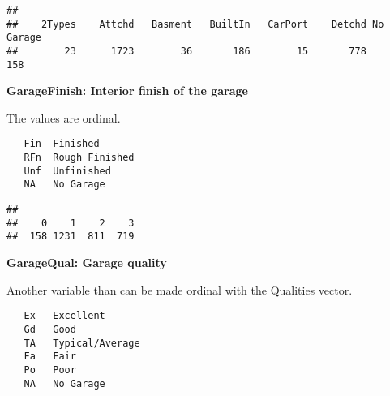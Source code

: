 \documentclass[]{article}
\newenvironment{Shaded}{\begin{snugshade}}{\end{snugshade}}
\newcommand{\DecValTok}[1]{\textcolor[rgb]{0.00,0.00,0.81}{#1}}
\newcommand{\KeywordTok}[1]{\textcolor[rgb]{0.13,0.29,0.53}{\textbf{#1}}}
\newcommand{\NormalTok}[1]{#1}
\newcommand{\OperatorTok}[1]{\textcolor[rgb]{0.81,0.36,0.00}{\textbf{#1}}}
\newcommand{\StringTok}[1]{\textcolor[rgb]{0.31,0.60,0.02}{#1}}
\begin{document}
\begin{verbatim}
## 
##    2Types    Attchd   Basment   BuiltIn   CarPort    Detchd No Garage 
##        23      1723        36       186        15       778       158
\end{verbatim}

\textbf{GarageFinish: Interior finish of the garage}

The values are ordinal.

\begin{verbatim}
   Fin  Finished
   RFn  Rough Finished  
   Unf  Unfinished
   NA   No Garage       
\end{verbatim}

\begin{Shaded}
\end{Shaded}

\begin{verbatim}
## 
##    0    1    2    3 
##  158 1231  811  719
\end{verbatim}

\textbf{GarageQual: Garage quality}

Another variable than can be made ordinal with the Qualities vector.

\begin{verbatim}
   Ex   Excellent
   Gd   Good
   TA   Typical/Average
   Fa   Fair
   Po   Poor
   NA   No Garage
   
\end{verbatim}

\begin{Shaded}
\end{Shaded}
\end{document}
